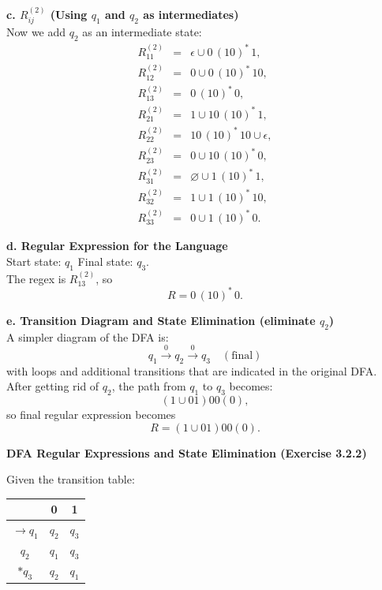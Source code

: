 \documentclass{article}
\theoremstyle{theorem}
\theoremstyle{definition}
\theoremstyle{remark}
\begin{document}
\textbf{c. \(R_{ij}^{(2)}\) (Using \(q_1\) and \(q_2\) as intermediates)}\\[1mm]
Now we add \(q_2\) as an intermediate state:
\[
\begin{array}{rcl}
R_{11}^{(2)} &=& \epsilon \cup 0\,(10)^*\,1,\\[1mm]
R_{12}^{(2)} &=& 0 \cup 0\,(10)^*\,10,\\[1mm]
R_{13}^{(2)} &=& 0\,(10)^*\,0,\\[1mm]
R_{21}^{(2)} &=& 1 \cup 10\,(10)^*\,1,\\[1mm]
R_{22}^{(2)} &=& 10\,(10)^*\,10 \cup \epsilon,\\[1mm]
R_{23}^{(2)} &=& 0 \cup 10\,(10)^*\,0,\\[1mm]
R_{31}^{(2)} &=& \varnothing \cup 1\,(10)^*\,1,\\[1mm]
R_{32}^{(2)} &=& 1 \cup 1\,(10)^*\,10,\\[1mm]
R_{33}^{(2)} &=& 0 \cup 1\,(10)^*\,0.
\end{array}
\]

\medskip

\textbf{d. Regular Expression for the Language}\\[1mm]
Start state: \(q_1\) \quad Final state: \(q_3\).\\[1mm]
The regex is \(R_{13}^{(2)}\), so
\[
R = 0\,(10)^*\,0.
\]

\medskip

\textbf{e. Transition Diagram and State Elimination (eliminate \(q_2\))}\\[1mm]
A simpler diagram of the DFA is:
\[
q_1 \xrightarrow{0} q_2 \xrightarrow{0} q_3\quad (\text{final})
\]
with loops and additional transitions that are indicated in the original DFA. After getting rid of \(q_2\), the path from \(q_1\) to \(q_3\) becomes:
\[
(1 \cup 01)00(0),
\]
so final regular expression becomes
\[
R = (1 \cup 01)00(0).
\]

\bigskip

\textbf{DFA Regular Expressions and State Elimination (Exercise 3.2.2)}

Given the transition table:
\begin{center}
\begin{tabular}{|c|c|c|}
\hline
       & 0   & 1   \\ \hline
$\rightarrow q_1$ & $q_2$ & $q_3$ \\ \hline
$q_2$ & $q_1$ & $q_3$ \\ \hline
$*q_3$ & $q_2$ & $q_1$ \\ \hline
\end{tabular}
\end{center}
\end{document}

